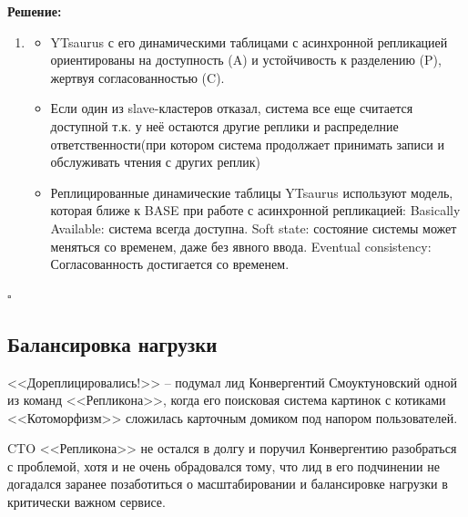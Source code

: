 \documentclass[12pt]{article}
\newenvironment{solution}
{
  \par\textbf{Решение:}\par\bigbreak
  \begingroup
}
{
  \par\bigbreak\hfill$\square$%
  \par\endgroup
}
\begin{document}
\begin{solution}
\begin{enumerate}
\begin{itemize}
\begin{itemize}
\begin{itemize}
            \end{itemize}
            \end{itemize}
        \item Если мы упёрлись в пределы вертикального масштабирования при Федерации, то стоит применить Шардирование к перегруженному федеративному узлу. Если мы упёрлись в пределы вертикального масштабирования при Шардировании, то нужно либо провести перешардирование и шардировать самый нагруженный шард, либо переместить редко используемые или большие данные в другие хранилища
        \end{itemize}
        \item 
        \begin{itemize}
        \item YTsaurus с его динамическими таблицами с асинхронной репликацией ориентированы на доступность (A) и устойчивость к разделению (P), жертвуя согласованностью (C).
        \item Если один из slave-кластеров отказал, система все еще считается доступной т.к. у неё остаются другие реплики и распределние ответственности(при котором система продолжает принимать записи и обслуживать чтения с других реплик)
        \item Реплицированные динамические таблицы YTsaurus используют модель, которая ближе к BASE при работе с асинхронной репликацией: Basically Available: система всегда доступна. Soft state: состояние системы может меняться со временем, даже без явного ввода. Eventual consistency: Согласованность достигается со временем.
        \end{itemize}
        \end{enumerate}
\end{solution}

\break
\subsection{Балансировка нагрузки }

<<Дореплицировались!>> – подумал лид Конвергентий Смоуктуновский одной из команд <<Репликона>>, когда его поисковая система
картинок с котиками <<Котоморфизм>> сложилась карточным домиком под напором пользователей.

\begin{flushleft}
CTO <<Репликона>> не остался в долгу и поручил Конвергентию разобраться с проблемой, хотя
и не очень обрадовался тому, что лид в его подчинении не догадался заранее позаботиться
о масштабировании и балансировке нагрузки в критически важном сервисе.
\end{flushleft}
\end{document}

